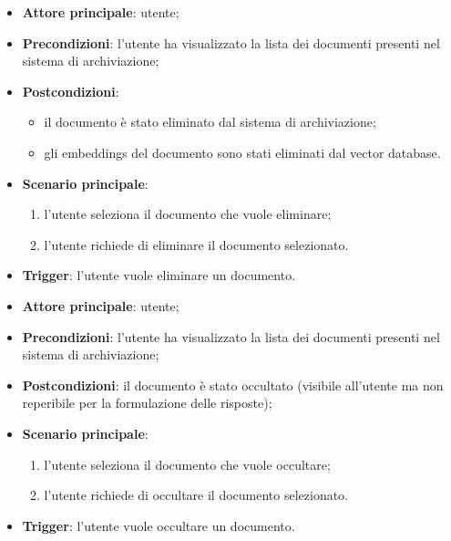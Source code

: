 \documentclass[10pt, a4paper]{article}
\begin{document}
    \begin{itemize}
        \item \textbf{Attore principale}: utente;
        \item \textbf{Precondizioni}: l’utente ha visualizzato la lista dei documenti presenti nel sistema di archiviazione;
        \item \textbf{Postcondizioni}:
        \begin{itemize}
            \item il documento è stato eliminato dal sistema di archiviazione;
            \item gli embeddings del documento sono stati eliminati dal vector database.
        \end{itemize}
        \item \textbf{Scenario principale}:
            \begin{enumerate}
                \item l’utente seleziona il documento che vuole eliminare;
                \item l’utente richiede di eliminare il documento selezionato.
            \end{enumerate}
        \item \textbf{Trigger}: l’utente vuole eliminare un documento.
    \end{itemize}

    \begin{itemize}
        \item \textbf{Attore principale}: utente;
        \item \textbf{Precondizioni}: l’utente ha visualizzato la lista dei documenti presenti nel sistema di archiviazione;
        \item \textbf{Postcondizioni}: il documento è stato occultato (visibile all’utente ma non reperibile per la formulazione delle risposte);
        \item \textbf{Scenario principale}:
            \begin{enumerate}
                \item l’utente seleziona il documento che vuole occultare;
                \item l’utente richiede di occultare il documento selezionato.
            \end{enumerate}
        \item \textbf{Trigger}: l’utente vuole occultare un documento.
    \end{itemize}
\end{document}
